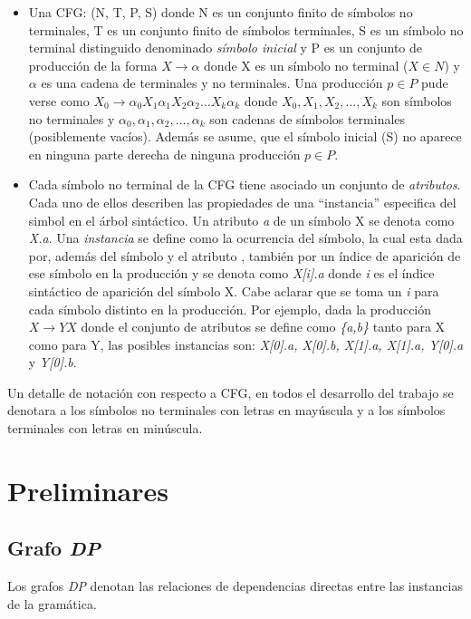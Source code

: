 \begin{itemize}
\item Una CFG: (N, T, P, S) donde N es un conjunto finito de símbolos no terminales, T es un conjunto finito de símbolos terminales, S es un símbolo no terminal distinguido denominado \textit{símbolo inicial} y P es un conjunto de producción de la forma $X\rightarrow\alpha$ donde X es un símbolo no terminal ($X\in N$) y $\alpha$ es una cadena de terminales y no terminales. Una producción $\textit{p}\in P$ pude verse como
 $X_{0}\rightarrow\alpha_{0}X_{1}\alpha_{1}X_{2}\alpha_{2}\dots X_{k}\alpha_{k}$ 
donde \textit{$X_{0}, X_{1}, X_{2},\dots, X_{k}$} son símbolos no terminales y  \textit{$\alpha_{0}, \alpha_{1}, \alpha_{2}, \dots, \alpha_{k}$} son cadenas de símbolos terminales (posiblemente vacíos). Además se asume, que el símbolo inicial (S) no aparece en ninguna parte derecha de ninguna producción $\textit{p} \in P.$
\item Cada símbolo no terminal de la CFG tiene asociado un conjunto de \textit{atributos}. Cada uno de ellos describen las propiedades de una ``instancia'' especifica del simbol en el árbol sintáctico. Un atributo \textit{a} de un símbolo X se denota como \textit{X.a}. Una \textit{instancia} se define como la ocurrencia del símbolo, la cual esta dada por, además del símbolo y el atributo , también por un índice de aparición de ese símbolo en la producción y se denota como \textit{X[i].a} donde \textit{i} es el índice sintáctico de aparición del símbolo X. Cabe aclarar que se toma un \textit{i} para cada símbolo distinto en la producción. Por ejemplo, dada la producción $X\rightarrow Y X$ donde el conjunto de atributos se define como \textit{\{a,b\}} tanto para X como para Y, las posibles instancias son: \textit{X[0].a, X[0].b, X[1].a, X[1].a, Y[0].a} y \textit{Y[0].b}.
\end{itemize}

Un detalle de notación con respecto a CFG, en todos el desarrollo del trabajo se denotara a los símbolos no terminales con letras en mayúscula y a los símbolos terminales con letras en minúscula.

\section{Preliminares}

\subsection{Grafo \textit{DP}}
Los grafos \textit{DP} denotan las relaciones de dependencias directas entre las instancias de la gramática. 

